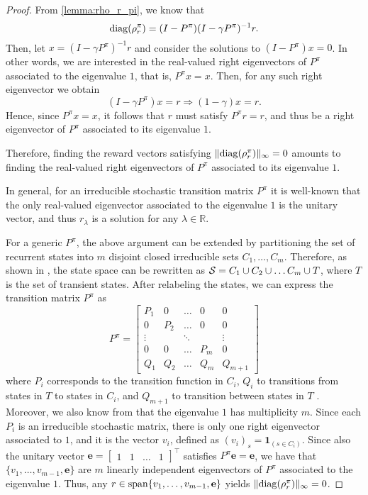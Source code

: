 \begin{proof}
From \cref{lemma:rho_r_pi}, we know that 
\[        {\rm diag}(\rho_r^\pi) = (I-P^\pi)(I-\gamma P^\pi)^{-1}r.\]
Then, let $x=(I-\gamma P^\pi)^{-1} r$ and consider the solutions to $(I-P^\pi) x= 0$. In other words, we are interested in the real-valued right eigenvectors of $P^\pi$ associated to the eigenvalue $1$, that is, $P^\pi x= x$. Then, for any such right eigenvector we obtain
\[
(I-\gamma P^\pi)x =r \Rightarrow (1-\gamma)x=r.
\]
Hence, since $P^\pi x=x$, it follows that  $r$ must satisfy $P^\pi r=r$, and thus be a right eigenvector of $P^\pi$ associated to its eigenvalue $1$.

Therefore, finding the reward vectors satisfying $\|{\rm diag}(\rho_r^\pi)\|_\infty=0$ amounts to finding the real-valued right eigenvectors of $P^\pi$ associated to its eigenvalue $1$.

In general, for an irreducible stochastic transition matrix $P^\pi$ it is well-known \cite{seneta2006non} that the only real-valued eigenvector associated to the eigenvalue $1$ is the unitary vector, and thus $r_\lambda$ is a solution for any $\lambda\in \mathbb{R}$.

For a generic $P^\pi$, the above argument can be extended by partitioning the set of recurrent states into $m$ disjoint closed irreducible sets $C_1,\dots, C_m$. Therefore, as shown in \cite{puterman2014markov}, the state space can be rewritten as ${\cal S} = C_1\cup C_2\cup \dots C_m \cup T$, where $T$ is the set of transient states. After relabeling the states, we can express the transition matrix $P^\pi$ as
\[
P^\pi = \begin{bmatrix}
    P_1 & 0 &\dots & 0 & 0\\
    0 & P_2 &\dots & 0 & 0\\
    \vdots & &\ddots & &  \vdots\\
    0 & 0 &  \dots & P_m & 0 \\
    Q_1 & Q_2 & \dots & Q_m & Q_{m+1}
\end{bmatrix}
\]
where $P_i$ corresponds to the transition function in $C_i$, $Q_i$ to transitions from states in $T$ to states in  $C_i$, and $Q_{m+1}$ to transition between states in $T$ \cite{puterman2014markov}. Moreover, we also know from \citep[Theorem A.5]{puterman2014markov} that the eigenvalue $1$ has multiplicity $m$. Since each $P_i$ is an irreducible stochastic matrix, there is only one right eigenvector associated to $1$, and it is the vector $v_i$, defined as $(v_i)_s = \mathbf{1}_{(s\in C_i)}$. Since also the unitary vector $\mathbf{e}=\begin{bmatrix} 1 & 1 &\dots & 1\end{bmatrix}^\top$ satisfies $P^\pi \mathbf{e}=\mathbf{e}$, we have that
 $\{v_1,\dots, v_{m-1}, \mathbf{e}\}$ are  $m$ linearly independent eigenvectors of $P^\pi$ associated to the eigenvalue $1$. Thus, any  $r\in {\rm span}\{v_1,\dots, v_{m-1},\mathbf{e}\}$ yields $\|{\rm diag}(\rho_r^\pi)\|_\infty=0$.
\end{proof}

